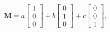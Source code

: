 \documentclass[preview]{standalone}
\begin{document}
\begin{align*}
\mathbf{M} = a \begin{bmatrix} 1 \\ 0 \\ 0 \end{bmatrix} + b \begin{bmatrix} 0 \\ 1 \\ 0 \end{bmatrix} + c \begin{bmatrix} 0 \\ 0 \\ 1 \end{bmatrix},
\end{align*}
\end{document}
